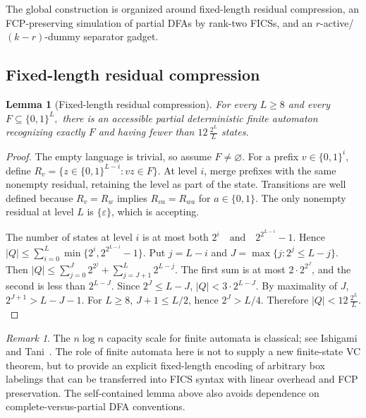 \documentclass[11pt]{article}
\newtheorem{lemma}[theorem]{Lemma}
\theoremstyle{definition}
\theoremstyle{remark}
\newtheorem{remark}[theorem]{Remark}
\begin{document}
The global construction is organized around fixed-length residual compression,
an FCP-preserving simulation of partial DFAs by rank-two FICSs, and an
\(r\)-active/\((k-r)\)-dummy separator gadget.

\subsection{Fixed-length residual compression}

\begin{lemma}[Fixed-length residual compression]
For every \(L\ge8\) and every
\(F\subseteq\{0,1\}^L,\)
there is an accessible partial deterministic finite automaton recognizing
exactly \(F\) and having fewer than
\(12\,\frac{2^L}{L}\)
states.
\end{lemma}

\begin{proof}
The empty language is trivial, so assume \(F\ne\varnothing\). For a prefix
\(v\in\{0,1\}^i\), define
\(R_v=\{z\in\{0,1\}^{L-i}:vz\in F\}.\)
At level \(i\), merge prefixes with the same nonempty residual, retaining the
level as part of the state. Transitions are well defined because
\(R_v=R_w\) implies \(R_{va}=R_{wa}\) for \(a\in\{0,1\}\). The only nonempty
residual at level \(L\) is \(\{\varepsilon\}\), which is accepting.

The number of states at level \(i\) is at most both
\(2^i \quad\text{and}\quad 2^{2^{L-i}}-1.\)
Hence
\(|Q| \le \sum_{i=0}^{L} \min\{2^i,2^{2^{L-i}}-1\}.\)
Put \(j=L-i\) and
\(J=\max\{j:2^j\le L-j\}.\)
Then
\(|Q| \le \sum_{j=0}^{J}2^{2^j} + \sum_{j=J+1}^{L}2^{L-j}.\)
The first sum is at most \(2\cdot 2^{2^J}\), and the second is less than
\(2^{L-J}\). Since \(2^J\le L-J\),
\(|Q|<3\cdot 2^{L-J}.\)
By maximality of \(J\),
\(2^{J+1}>L-J-1.\)
For \(L\ge8\), \(J+1\le L/2\), hence \(2^J>L/4\). Therefore
\(|Q|<12\,\frac{2^L}{L}.\)
\end{proof}

\begin{remark}
The \(n\log n\) capacity scale for finite automata is classical; see
Ishigami and Tani~\cite{IshigamiTani1997}.  The role of finite automata here is
not to supply a new finite-state VC theorem, but to provide an explicit
fixed-length encoding of arbitrary box labelings that can be transferred into
FICS syntax with linear overhead and FCP preservation.  The self-contained
lemma above also avoids dependence on complete-versus-partial DFA conventions.
\end{remark}
\end{document}
